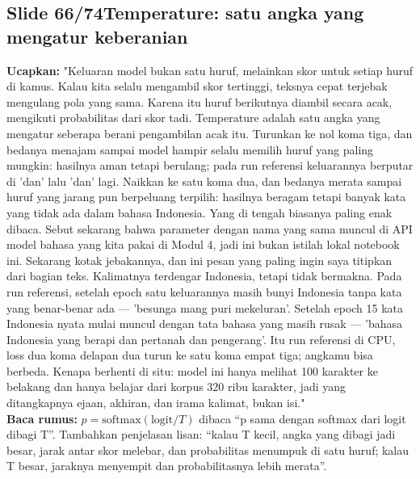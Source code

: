 \documentclass[11pt]{article}
\renewcommand{\framebox}[1]{\colorbox{acc!15}{\textcolor{acc}{\textbf{#1}}}}
\begin{document}
\subsection*{\framebox{Slide 66/74}\quad Temperature: satu angka yang mengatur keberanian}
\textbf{Ucapkan:} "Keluaran model bukan satu huruf, melainkan skor untuk setiap huruf di kamus. Kalau kita selalu mengambil skor tertinggi, teksnya cepat terjebak mengulang pola yang sama. Karena itu huruf berikutnya diambil secara acak, mengikuti probabilitas dari skor tadi. Temperature adalah satu angka yang mengatur seberapa berani pengambilan acak itu. Turunkan ke nol koma tiga, dan bedanya menajam sampai model hampir selalu memilih huruf yang paling mungkin: hasilnya aman tetapi berulang; pada run referensi keluarannya berputar di 'dan' lalu 'dan' lagi. Naikkan ke satu koma dua, dan bedanya merata sampai huruf yang jarang pun berpeluang terpilih: hasilnya beragam tetapi banyak kata yang tidak ada dalam bahasa Indonesia. Yang di tengah biasanya paling enak dibaca. Sebut sekarang bahwa parameter dengan nama yang sama muncul di API model bahasa yang kita pakai di Modul 4, jadi ini bukan istilah lokal notebook ini. Sekarang kotak jebakannya, dan ini pesan yang paling ingin saya titipkan dari bagian teks. Kalimatnya terdengar Indonesia, tetapi tidak bermakna. Pada run referensi, setelah epoch satu keluarannya masih bunyi Indonesia tanpa kata yang benar-benar ada --- 'besunga mang puri mekeluran'. Setelah epoch 15 kata Indonesia nyata mulai muncul dengan tata bahasa yang masih rusak --- 'bahasa Indonesia yang berapi dan pertanah dan pengerang'. Itu run referensi di CPU, loss dua koma delapan dua turun ke satu koma empat tiga; angkamu bisa berbeda. Kenapa berhenti di situ: model ini hanya melihat 100 karakter ke belakang dan hanya belajar dari korpus 320 ribu karakter, jadi yang ditangkapnya ejaan, akhiran, dan irama kalimat, bukan isi."\\[2pt]
\textbf{Baca rumus:} $p = \mathrm{softmax}(\text{logit} / T)$ dibaca ``p sama dengan softmax dari logit dibagi T''. Tambahkan penjelasan lisan: ``kalau T kecil, angka yang dibagi jadi besar, jarak antar skor melebar, dan probabilitas menumpuk di satu huruf; kalau T besar, jaraknya menyempit dan probabilitasnya lebih merata''.\\[2pt]
\end{document}
